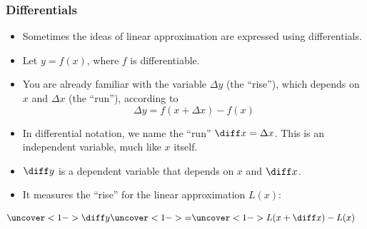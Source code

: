 \begin{frame}
\frametitle{Differentials}
\begin{itemize}
\item  Sometimes the ideas of linear approximation are expressed using differentials.
\item  Let $y = f(x)$, where $f$ is differentiable.
\item  You are already familiar with the variable $\Delta y$ (the ``rise''), which depends on $x$ and $\Delta x$ (the ``run''), according to
\[
\Delta y = f(x + \Delta x) - f(x)
\]
\item  In differential notation, we name the ``run'' $\diff x = \Delta x$.  This is an independent variable, much like $x$ itself.
\item  $\diff y$ is a dependent variable that depends on $x$ and $\diff x$.
\item  It measures the ``rise'' for the linear approximation $L(x)$:
\end{itemize}
\begin{align*}
\uncover<1->{%
\diff y%
}%
& \uncover<1->{ = } %
\uncover<1->{%
L(x+\diff x) - L(x)%
}%
\end{align*}
\end{frame}


